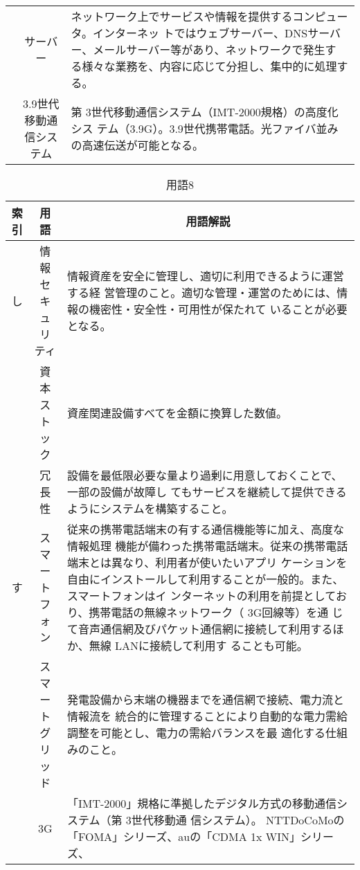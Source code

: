 \begin{table}[htb]
\begin{center}
\begin{tabular}{|c|c|p{10cm}|}
      \cline{2-3}
      & サーバー & ネットワーク上でサービスや情報を提供するコンピュータ。インターネッ
      トではウェブサーバー、DNSサーバー、メールサーバー等があり、ネットワークで発生す
      る様々な業務を、内容に応じて分担し、集中的に処理する。 \\
      \cline{2-3}
      & 3.9世代移動通信システム & 第 3世代移動通信システム（IMT-2000規格）の高度化シス
      テム（3.9G）。3.9世代携帯電話。光ファイバ並みの高速伝送が可能となる。\\
      \hline
    \end{tabular}
  \end{center}
\end{table}


\begin{table}[htb]
  \begin{center}
    \caption{用語8}
    \begin{tabular}{|c|c|p{10cm}|}
      \hline
      索引 & 用語 & \multicolumn{1}{c|}{用語解説} \\
      \hline
      し & 情報セキュリティ & 情報資産を安全に管理し、適切に利用できるように運営する経
      営管理のこと。適切な管理・運営のためには、情報の機密性・安全性・可用性が保たれて
      いることが必要となる。 \\
      \cline{2-3}
      & 資本ストック & 資産関連設備すべてを金額に換算した数値。 \\
      \cline{2-3}
      & 冗長性 & 設備を最低限必要な量より過剰に用意しておくことで、一部の設備が故障し
      てもサービスを継続して提供できるようにシステムを構築すること。 \\
      \hline
      す & スマートフォン & 従来の携帯電話端末の有する通信機能等に加え、高度な情報処理
      機能が備わった携帯電話端末。従来の携帯電話端末とは異なり、利用者が使いたいアプリ
      ケーションを自由にインストールして利用することが一般的。また、スマートフォンはイ
      ンターネットの利用を前提としており、携帯電話の無線ネットワーク（ 3G回線等）を通
      じて音声通信網及びパケット通信網に接続して利用するほか、無線 LANに接続して利用す
      ることも可能。 \\
      \cline{2-3}
      & スマートグリッド & 発電設備から末端の機器までを通信網で接続、電力流と情報流を
      統合的に管理することにより自動的な電力需給調整を可能とし、電力の需給バランスを最
      適化する仕組みのこと。 \\
      \cline{2-3}
      & 3G & 「IMT-2000」規格に準拠したデジタル方式の移動通信システム（第 3世代移動通
        信システム）。 NTTDoCoMoの「FOMA」シリーズ、auの「CDMA 1x WIN」シリーズ、

\end{tabular}
\end{center}
\end{table}
